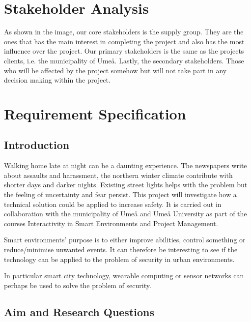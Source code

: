 \documentclass[twoside]{report}
\begin{document}
\newpage
{}
\section{Stakeholder Analysis}
\begin{rightsiderules}
As shown in the image, our core stakeholders is the supply
group. They are the ones that has the main interest in completing the project
and also has the most influence over the project. Our primary stakeholders is
the same as the projects clients, i.e. the municipality of Umeå.
Lastly, the secondary stakeholders. Those who will be affected by the project
somehow but will not take part in any decision making within the project.
\end{rightsiderules}

\section{Requirement Specification}

\subsection{Introduction}

Walking home late at night can be a daunting experience. The newspapers write
about assaults and harassment, the northern winter climate contribute with
shorter days and darker nights. Existing street lights helps with the problem
but the feeling of uncertainty and fear persist. This project will investigate
how a technical solution could be applied to increase safety. It is carried out
in collaboration with the municipality of Umeå and Umeå University as part of
the courses Interactivity in Smart Environments and Project Management.

Smart environments’ purpose is to either improve abilities, control something
or reduce/minimise unwanted events. It can therefore be interesting to see if
the technology can be applied to the problem of security in urban environments. 

In particular smart city technology, wearable computing or sensor networks can
perhaps be used to solve the problem of security. 

\subsection{Aim and Research Questions}
\end{document}
